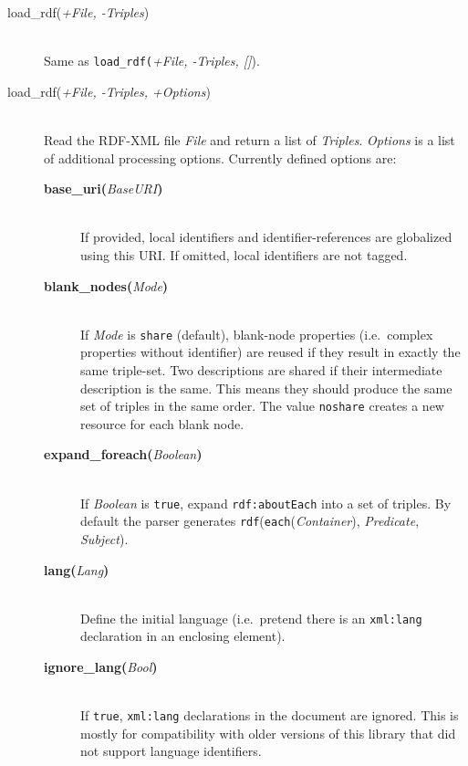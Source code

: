 \begin{description}
    \item[load\_rdf({\it +File, -Triples})]\mbox{}\\
    Same as {\tt load\_rdf(}{}{\it +File, -Triples, []}{)}.

    \item[load\_rdf({\it +File, -Triples, +Options})]\mbox{}\\
    Read the RDF-XML file {\it File} and return a list of {\it Triples}.
{\it Options} is a list of additional processing options.  Currently defined
options are:

\begin{description}
  \item[{\bf base\_uri}{\bf (}{\it BaseURI}{\bf)}]\mbox{}\\
If provided, local identifiers and identifier-references are globalized
using this URI.  If omitted, local identifiers are not tagged.

  \item[{\bf blank\_nodes}{\bf (}{\it Mode}{\bf)}]\mbox{}\\
If {\it Mode} is {\tt share} (default), blank-node properties (i.e.\
complex properties without identifier) are reused if they result in
exactly the same triple-set. Two descriptions are shared if their
intermediate description is the same. This means they should produce the
same set of triples in the same order. The value {\tt noshare} creates
a new resource for each blank node.

  \item[{\bf expand\_foreach}{\bf (}{\it Boolean}{\bf)}]\mbox{}\\
If {\it Boolean} is {\tt true}, expand {\tt rdf:aboutEach} into
a set of triples. By default the parser generates
\texttt{rdf}(\texttt{each}(\emph{Container}), \emph{Predicate}, \emph{Subject}).

  \item[{\bf lang}{\bf (}{\it Lang}{\bf)}]\mbox{}\\
Define the initial language (i.e.\ pretend there is an {\tt xml:lang}
declaration in an enclosing element).

  \item[{\bf ignore\_lang}{\bf (}{\it Bool}{\bf)}]\mbox{}\\
If {\tt true}, {\tt xml:lang} declarations in the document are
ignored.  This is mostly for compatibility with older versions of
this library that did not support language identifiers.


\end{description}
\end{description}
